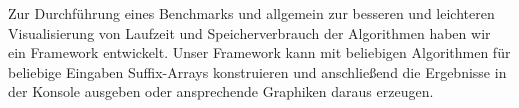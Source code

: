 Zur  Durchführung eines Benchmarks und allgemein zur besseren und leichteren Visualisierung von Laufzeit und Speicherverbrauch der Algorithmen haben wir ein Framework entwickelt. Unser Framework kann mit beliebigen Algorithmen für beliebige Eingaben Suffix-Arrays konstruieren und anschließend die Ergebnisse in der Konsole ausgeben oder ansprechende Graphiken daraus erzeugen.
